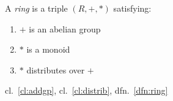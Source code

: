 \leavevmode\hypertarget{dfn:ring}{}%
A \emph{ring} is a triple \((R,+,*)\) satisfying:

\begin{enumerate}
\tightlist
\item
  \protect\hypertarget{cl:addgp}{}{\(+\) is an abelian group}
\item
  \protect\hypertarget{cl:multmon}{}{\(*\) is a monoid}
\item
  \protect\hypertarget{cl:distrib}{}{\(*\) distributes over \(+\)}
\end{enumerate}

cl.~\ref{cl:addgp}, cl.~\ref{cl:distrib}, dfn.~\ref{dfn:ring}
